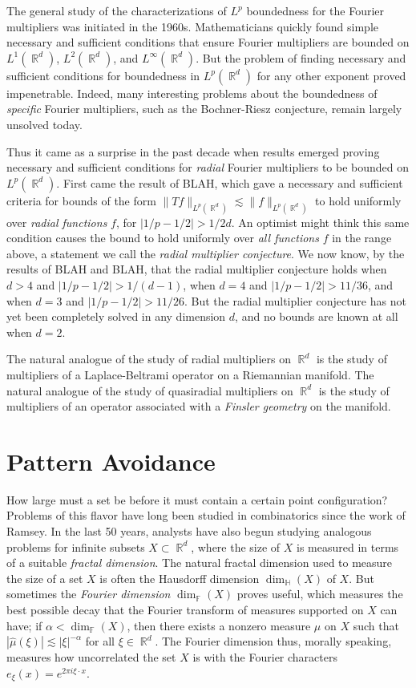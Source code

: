 \documentclass[12pt]{article}
\DeclareMathOperator{\RR}{\mathbb{R}}
\begin{document}
The general study of the characterizations of $L^p$ boundedness for the Fourier multipliers was initiated in the 1960s. Mathematicians quickly found simple necessary and sufficient conditions that ensure Fourier multipliers are bounded on $L^1(\RR^d)$, $L^2(\RR^d)$, and $L^\infty(\RR^d)$. But the problem of finding necessary and sufficient conditions for boundedness in $L^p(\RR^d)$ for any other exponent proved impenetrable. Indeed, many interesting problems about the boundedness of \emph{specific} Fourier multipliers, such as the Bochner-Riesz conjecture, remain largely unsolved today.

Thus it came as a surprise in the past decade when results emerged proving necessary and sufficient conditions for \emph{radial} Fourier multipliers to be bounded on $L^p(\RR^d)$. First came the result of BLAH, which gave a necessary and sufficient criteria for bounds of the form $\| Tf \|_{L^p(\RR^d)} \lesssim \| f \|_{L^p(\RR^d)}$ to hold uniformly over \emph{radial functions} $f$, for $|1/p - 1/2| > 1/2d$. An optimist might think this same condition causes the bound to hold uniformly over \emph{all functions} $f$ in the range above, a statement we call the \emph{radial multiplier conjecture}. We now know, by the results of BLAH and BLAH, that the radial multiplier conjecture holds when $d > 4$ and $|1/p - 1/2| > 1/(d-1)$, when $d = 4$ and $|1/p - 1/2| > 11/36$, and when $d = 3$ and $|1/p - 1/2| > 11/26$. But the radial multiplier conjecture has not yet been completely solved in any dimension $d$, and no bounds are known at all when $d = 2$.

The natural analogue of the study of radial multipliers on $\RR^d$ is the study of multipliers of a Laplace-Beltrami operator on a Riemannian manifold. The natural analogue of the study of quasiradial multipliers on $\RR^d$ is the study of multipliers of an operator associated with a \emph{Finsler geometry} on the manifold.

\section*{Pattern Avoidance}

How large must a set be before it must contain a certain point configuration? Problems of this flavor have long been studied in combinatorics since the work of Ramsey. In the last 50 years, analysts have also begun studying analogous problems for infinite subsets $X \subset \RR^d$, where the size of $X$ is measured in terms of a suitable \emph{fractal dimension}. The natural fractal dimension used to measure the size of a set $X$ is often the Hausdorff dimension $\dim_{\mathbb{H}}(X)$ of $X$. But sometimes the \emph{Fourier dimension} $\dim_{\mathbb{F}}(X)$ proves useful, which measures the best possible decay that the Fourier transform of measures supported on $X$ can have; if $\alpha < \dim_{\mathbb{F}}(X)$, then there exists a nonzero measure $\mu$ on $X$ such that $|\widehat{\mu}(\xi)| \lesssim |\xi|^{-\alpha}$ for all $\xi \in \RR^d$. The Fourier dimension thus, morally speaking, measures how uncorrelated the set $X$ is with the Fourier characters $e_\xi(x) = e^{2 \pi i \xi \cdot x}$.
\end{document}
